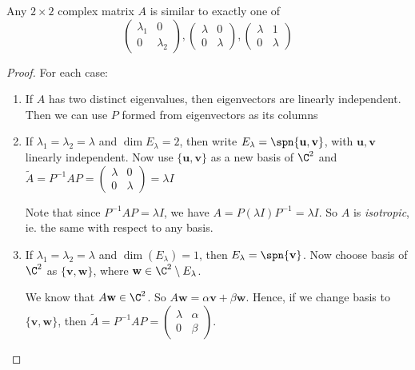 \documentclass[a4paper]{article}
\begin{document}
\begin{thm}
  Any $2\times 2$ complex matrix $A$ is similar to exactly one of
  \[
    \begin{pmatrix}
      \lambda_1 & 0\\
      0 & \lambda_2
    \end{pmatrix},
    \begin{pmatrix}
      \lambda & 0\\
      0 & \lambda
    \end{pmatrix},
    \begin{pmatrix}
      \lambda & 1\\
      0 & \lambda
    \end{pmatrix}
  \]
\end{thm}
\begin{proof}
  For each case:
  \begin{enumerate}
    \item If $A$ has two distinct eigenvalues, then eigenvectors are linearly independent. Then we can use $P$ formed from eigenvectors as its columns
    \item If $\lambda_1=\lambda_2 = \lambda$ and $\dim E_\lambda = 2$, then write $E_\lambda = \spn\{\mathbf{u}, \mathbf{v}\}$, with $\mathbf{u}, \mathbf{v}$ linearly independent. Now use $\{\mathbf{u}, \mathbf{v}\}$  as a new basis of $\C^2$ and $\tilde{A} = P^{-1}AP =
      \begin{pmatrix}
        \lambda & 0\\
        0 & \lambda
      \end{pmatrix} = \lambda I$

      Note that since $P^{-1}AP = \lambda I$, we have $A = P(\lambda I)P^{-1} = \lambda I$. So $A$ is \emph{isotropic}, ie. the same with respect to any basis.
    \item If $\lambda_1 = \lambda_2 = \lambda$ and $\dim (E_\lambda) = 1$, then $E_\lambda = \spn\{\mathbf{v}\}$. Now choose basis of $\C^2$ as $\{\mathbf{v}, \mathbf{w}\}$, where $\mathbf{w}\in \C^2\setminus E_\lambda$.

      We know that $A\mathbf{w}\in \C^2$. So $A\mathbf{w} = \alpha \mathbf{v} + \beta \mathbf{w}$. Hence, if we change basis to $\{\mathbf{v}, \mathbf{w}\}$, then $\tilde{A} = P^{-1}AP =
      \begin{pmatrix}
        \lambda & \alpha\\
        0 & \beta
      \end{pmatrix}$.


\end{enumerate}
\end{proof}
\end{document}
